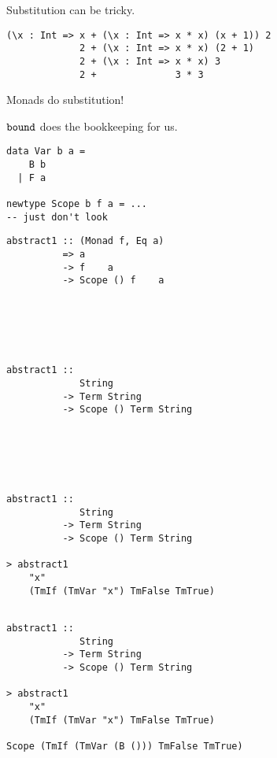 \documentclass[aspectration=169]{beamer}
\begin{document}
\begin{frame}[fragile]
  \begin{center}
   Substitution can be tricky.
  \end{center}
  \begin{verbatim}
(\x : Int => x + (\x : Int => x * x) (x + 1)) 2
             2 + (\x : Int => x * x) (2 + 1)
             2 + (\x : Int => x * x) 3
             2 +              3 * 3
  \end{verbatim}  
\end{frame}

\begin{frame}[fragile]
  \begin{center}
    Monads do substitution!
  \end{center}
\end{frame}

\begin{frame}[fragile]
  \begin{center}
    $\tt{bound}$ does the bookkeeping for us.
  \end{center}
\end{frame}

\begin{frame}[fragile]
  \begin{verbatim}
data Var b a = 
    B b 
  | F a

newtype Scope b f a = ...
-- just don't look
  \end{verbatim}  
\end{frame}

\begin{frame}[fragile]
  \begin{overprint}
  \begin{verbatim}
abstract1 :: (Monad f, Eq a) 
          => a 
          -> f    a 
          -> Scope () f    a






  \end{verbatim}  
  \begin{verbatim}
abstract1 :: 
             String 
          -> Term String 
          -> Scope () Term String






  \end{verbatim}  
  \begin{verbatim}
abstract1 :: 
             String 
          -> Term String 
          -> Scope () Term String

> abstract1 
    "x" 
    (TmIf (TmVar "x") TmFalse TmTrue)


  \end{verbatim}  
  \begin{verbatim}
abstract1 :: 
             String 
          -> Term String 
          -> Scope () Term String

> abstract1 
    "x" 
    (TmIf (TmVar "x") TmFalse TmTrue)

Scope (TmIf (TmVar (B ())) TmFalse TmTrue) 
  \end{verbatim}  
  \end{overprint}
\end{frame}
\end{document}
